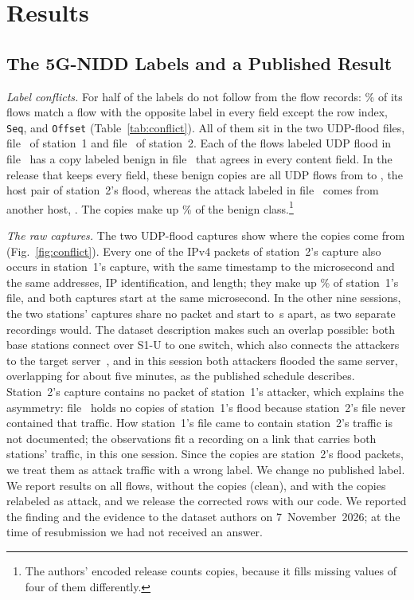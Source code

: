 \section{Results}
\label{sec:results}

\subsection{The 5G-NIDD Labels and a Published Result}
\label{sec:res:labels}

\emph{Label conflicts.} For half of \DB{} the labels do not follow from the flow records: \LcShareAll\% of its flows match a flow with the opposite label in every field except the row index, \texttt{Seq}, and \texttt{Offset} (Table~\ref{tab:conflict}). All of them sit in the two UDP-flood files, file~\LcBenignFile{} of station~1 and file~\LcAttackFile{} of station~2. Each of the \RCopies{} flows labeled UDP flood in file~\LcAttackFile{} has a copy labeled benign in file~\LcBenignFile{} that agrees in every content field. In the release that keeps every field, these benign copies are all UDP flows from \LcAddrSrc{} to \LcAddrDst{}, the host pair of station~2's flood, whereas the attack labeled in file~\LcBenignFile{} comes from another host, \LcAddrOwnSrc{}. The copies make up \RCopiesPct\% of the benign class.\footnote{The authors' encoded release counts \LcTwinBenign{} copies, because it fills missing values of four of them differently.}

\emph{The raw captures.} The two UDP-flood captures show where the copies come from (Fig.~\ref{fig:conflict}). Every one of the \RPcapBSTwoPkts{} IPv4 packets of station~2's capture also occurs in station~1's capture, with the same timestamp to the microsecond and the same addresses, IP identification, and length; they make up \RPcapShareBSOne\% of station~1's file, and both captures start at the same microsecond. In the other nine sessions, the two stations' captures share no packet and start \RPcapStartMin{} to \RPcapStartMax{}\,s apart, as two separate recordings would. The dataset description makes such an overlap possible: both base stations connect over S1-U to one switch, which also connects the attackers to the target server~\cite{samarakoon2022niddarxiv,siriwardhana2025descriptor}, and in this session both attackers flooded the same server, overlapping for about five minutes, as the published schedule describes. Station~2's capture contains no packet of station~1's attacker, which explains the asymmetry: file~\LcAttackFile{} holds no copies of station~1's flood because station~2's file never contained that traffic. How station~1's file came to contain station~2's traffic is not documented; the observations fit a recording on a link that carries both stations' traffic, in this one session. Since the copies are station~2's flood packets, we treat them as attack traffic with a wrong label. We change no published label. We report results on all flows, without the copies (clean), and with the copies relabeled as attack, and we release the \RCopies{} corrected rows with our code. We reported the finding and the evidence to the dataset authors on 7~November~2026; at the time of resubmission we had not received an answer.

